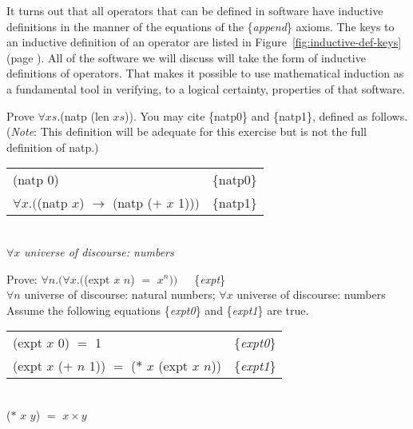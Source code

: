 It turns out that all operators that can be defined in
software
have inductive definitions in the manner of the equations
of the \{\emph{append}\} axioms.
The keys to an inductive definition of an operator are  listed in
Figure~\ref{fig:inductive-def-keys} (page \pageref{fig:inductive-def-keys}).
All of the software we will discuss will take the form of
inductive definitions of operators.
That makes it possible to use mathematical induction as
a fundamental tool in verifying, to a logical certainty,
properties of that software.

\begin{ExerciseList}

\Exercise Prove $\forall xs.$\textsf{(natp (len $xs$))}.
You may cite
\{natp0\} and \{natp1\},
defined as follows. (\emph{Note}: This definition will be adequate for this exercise but is not the full definition of \textsf{natp}.)
\begin{center}
\begin{tabular}{ll}
\textsf{(natp 0)}                                            & \{natp0\}\\
$\forall x.($\textsf{(natp $x$)} $\rightarrow$ \textsf{(natp (+ $x$ 1))}$)$ & \{natp1\}\\
\hline
\end{tabular}\\
$\forall x$ \emph{universe of discourse: numbers}
\end{center}

\Exercise
Prove: $\forall n.(\forall x.($\textsf{(expt $x$ $n$)} $=$ $x^n))$~~~\{\emph{expt}\}\\
\hspace*{16mm}$\forall n$ universe of discourse: natural numbers;
$\forall x$ universe of discourse: numbers\\
\hspace*{16mm}Assume the following equations \{\emph{expt0}\} and \{\emph{expt1}\} are true.
\begin{samepage}
\label{expt-equations}\label{expt-thm}
\begin{center}
\begin{tabular}{ll}
\textsf{(expt $x$ 0)} $=$ 1                                & \{\emph{expt0}\} \\
\textsf{(expt $x$ (+ $n$ 1))} $=$ \textsf{($*$ $x$ (expt $x$ $n$))} & \{\emph{expt1}\} \\
\hline
\end{tabular}\\
\textsf{($*$ $x$ $y$)} $=$ $x \times y$
\end{center}
\end{samepage}

\end{ExerciseList}

